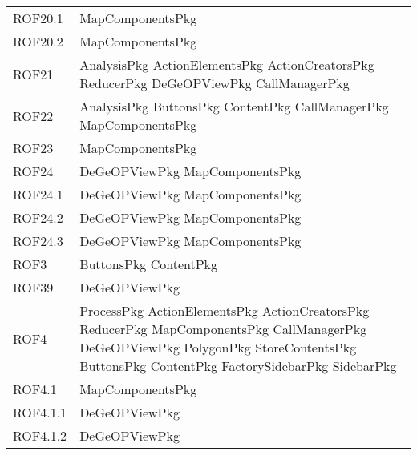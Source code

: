 \begin{longtable}{p{2.5cm}!{\VRule[1pt]}p{5cm}}
		ROF20.1 & MapComponentsPkg\\
		ROF20.2 & MapComponentsPkg\\
		ROF21 & AnalysisPkg \newline ActionElementsPkg \newline ActionCreatorsPkg \newline ReducerPkg \newline DeGeOPViewPkg \newline CallManagerPkg\\
		ROF22 & AnalysisPkg \newline ButtonsPkg \newline ContentPkg \newline CallManagerPkg \newline MapComponentsPkg\\
		ROF23 & MapComponentsPkg\\
		ROF24 & DeGeOPViewPkg \newline MapComponentsPkg\\
		ROF24.1 & DeGeOPViewPkg \newline MapComponentsPkg\\
		ROF24.2 & DeGeOPViewPkg \newline MapComponentsPkg\\
		ROF24.3 & DeGeOPViewPkg \newline MapComponentsPkg\\
		ROF3 & ButtonsPkg \newline ContentPkg\\
		ROF39 & DeGeOPViewPkg\\
		ROF4 & ProcessPkg \newline ActionElementsPkg \newline ActionCreatorsPkg \newline ReducerPkg \newline MapComponentsPkg \newline CallManagerPkg \newline DeGeOPViewPkg \newline PolygonPkg \newline StoreContentsPkg \newline ButtonsPkg \newline ContentPkg \newline FactorySidebarPkg \newline SidebarPkg\\
		ROF4.1 & MapComponentsPkg\\
		ROF4.1.1 & DeGeOPViewPkg\\
		ROF4.1.2 & DeGeOPViewPkg\\

\end{longtable}
